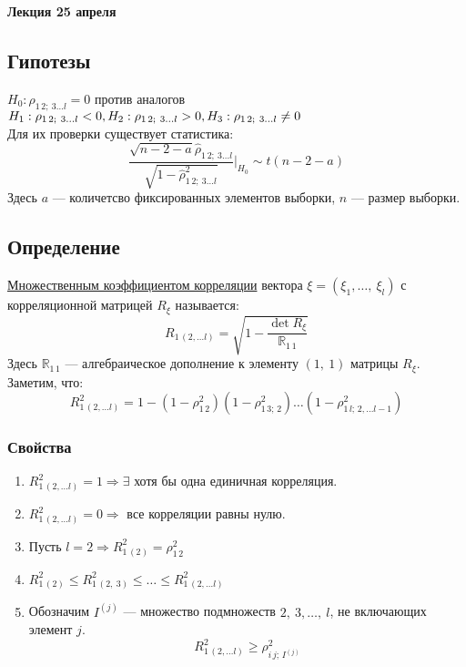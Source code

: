 \documentclass[12pt, a4paper]{article}
\begin{document}
\begin{center}
    \bf Лекция 25 апреля
\end{center}

\subsection*{Гипотезы}
$H_0: \rho_{1\, 2;\ 3\dots l} = 0$ против аналогов\\
$H_1: \rho_{1\, 2;\ 3\dots l} < 0,\\
H_2: \rho_{1\, 2;\ 3\dots l} > 0,\\
H_3: \rho_{1\, 2;\ 3\dots l} \neq 0$\\
Для их проверки существует статистика:
\[
\frac{\sqrt{n - 2 - a} \hat \rho_{1\, 2;\ 3\dots l}}{\sqrt{1 - \hat \rho^2_{1\, 2;\ 3\dots l}}} \Bigg|_{H_0} \sim t(n - 2 - a)
\]
Здесь $a$ --- количетсво фиксированных элементов выборки, $n$ --- размер выборки.
\subsection*{Определение}
\underline{Множественным коэффициентом корреляции} вектора $\xi = \left( \xi_1,\dots,\ \xi_l \right)$ с корреляционной матрицей $R_{\xi}$ называется:
\[
R_{1\, (2,\dots l)} = \sqrt{1 - \frac{\det R_{\xi}}{\mathbb{R}_{1\, 1}}}
\]
Здесь $\mathbb{R}_{1\, 1}$ --- алгебраическое дополнение к элементу $(1,\ 1)$ матрицы $R_{\xi}$.\\
Заметим, что:
\[
R^2_{1\, (2,\dots l)} = 1 - \left( 1 - \rho_{1\, 2}^2 \right) \left( 1 - \rho_{1\, 3;\, 2}^2 \right) \dots \left( 1 - \rho^2_{1\, l;\, 2,\dots l - 1} \right)
\]
\subsubsection*{Свойства}
\begin{enumerate}
    \item $R^2_{1\, (2,\dots l)} = 1 \Rightarrow \exists$ хотя бы одна единичная корреляция.
    \item $R^2_{1\, (2,\dots l)} = 0 \Rightarrow $ все корреляции равны нулю.
    \item Пусть $l = 2 \Rightarrow R^2_{1\, (2)} = \rho^2_{1\, 2}$
    \item $R^2_{1\, (2)} \leq R^2_{1\, (2,\ 3)} \leq \dots \leq R^2_{1\, (2,\dots l)}$
    \item Обозначим $I^{(j)}$ --- множество подмножеств ${2,\ 3,\dots,\ l}$, не включающих элемент $j$.
    \[
        R^2_{1\, (2,\dots l)} \geq \rho^2_{i\, j;\, I^{(j)}}
    \]
\end{enumerate}
\end{document}
